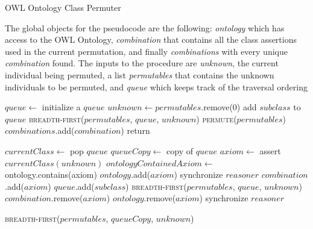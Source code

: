 \documentclass{article}
\begin{document}
  \begin{algorithm}
    \caption{OWL Ontology Class Permuter}
    The global objects for the pseudocode are the following:
    \emph{ontology} which has access to the OWL Ontology,
    \emph{combination} that contains all the class assertions
    used in the current permutation, and finally \emph{combinations} with every unique \emph{combination} found.
    The inputs to the procedure are
    \emph{unknown}, the current individual being permuted,
    a list \emph{permutables} that contains the unknown individuals to be permuted, and
    \emph{queue} which keeps track of the traversal ordering
    \begin{algorithmic}[0]
      \State

      \State $queue \leftarrow$ initialize a $queue$
      \State $unknown \leftarrow permutables$.remove(0)
      \State add $subclass$ to $queue$
      \EndFor
      \State \textsc{breadth-first}($permutables$, $queue$, $unknown$)
      \State
      \EndProcedure
      \State \textsc{permute}($permutables$)
      \State $combinations$.add($combination$)
      \EndIf
      \State return
      \EndIf

      \State
      \State $currentClass \leftarrow$ pop $queue$
      \State $queueCopy \leftarrow$ copy of $queue$
      \State $axiom \leftarrow$ assert $currentClass(unknown)$
      \State $ontologyContainedAxiom \leftarrow$ ontology.contains(axiom)
      \State
      \State $ontology$.add($axiom$)
      \State synchronize $reasoner$
      \State
      \EndIf
      \State $combination$.add($axiom$)
      \State $queue$.add($subclass$)
      \EndIf
      \EndFor
      \State
      \State \textsc{breadth-first}($permutables$, $queue$, $unknown$)
      \State $combination$.remove($axiom$)
      \EndIf
      \State
      \State $ontology$.remove($axiom$)
      \State synchronize $reasoner$
      \EndIf

      \State \textsc{breadth-first}($permutables$, $queueCopy$, $unknown$)

      \EndProcedure

    \end{algorithmic}
  \end{algorithm}
\end{document}
